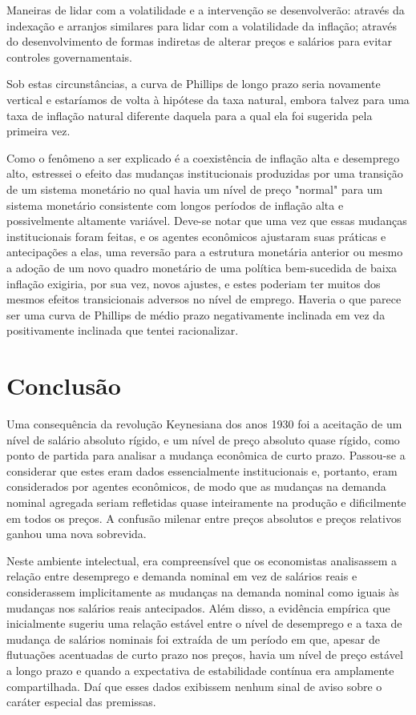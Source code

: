 \documentclass[12pt]{article}
\begin{document}
Maneiras de lidar com a volatilidade e a intervenção se desenvolverão: através da indexação e arranjos similares para lidar com a volatilidade da inflação; através do desenvolvimento de formas indiretas de alterar preços e salários para evitar controles governamentais.

Sob estas circunstâncias, a curva de Phillips de longo prazo seria novamente vertical e estaríamos de volta à hipótese da taxa natural, embora talvez para uma taxa de inflação natural diferente daquela para a qual ela foi sugerida pela primeira vez.

Como o fenômeno a ser explicado é a coexistência de inflação alta e desemprego alto, estressei o efeito das mudanças institucionais produzidas por uma transição de um sistema monetário no qual havia um nível de preço "normal" para um sistema monetário consistente com longos períodos de inflação alta e possivelmente altamente variável. Deve-se notar que uma vez que essas mudanças institucionais foram feitas, e os agentes econômicos ajustaram suas práticas e antecipações a elas, uma reversão para a estrutura monetária anterior ou mesmo a adoção de um novo quadro monetário de uma política bem-sucedida de baixa inflação exigiria, por sua vez, novos ajustes, e estes poderiam ter muitos dos mesmos efeitos transicionais adversos no nível de emprego. Haveria o que parece ser uma curva de Phillips de médio prazo negativamente inclinada em vez da positivamente inclinada que tentei racionalizar.

\section{Conclusão}

Uma consequência da revolução Keynesiana dos anos 1930 foi a aceitação de um nível de salário absoluto rígido, e um nível de preço absoluto quase rígido, como ponto de partida para analisar a mudança econômica de curto prazo. Passou-se a considerar que estes eram dados essencialmente institucionais e, portanto, eram considerados por agentes econômicos, de modo que as mudanças na demanda nominal agregada seriam refletidas quase inteiramente na produção e dificilmente em todos os preços. A confusão milenar entre preços absolutos e preços relativos ganhou uma nova sobrevida.

Neste ambiente intelectual, era compreensível que os economistas analisassem a relação entre desemprego e demanda nominal em vez de salários reais e considerassem implicitamente as mudanças na demanda nominal como iguais às mudanças nos salários reais antecipados. Além disso, a evidência empírica que inicialmente sugeriu uma relação estável entre o nível de desemprego e a taxa de mudança de salários nominais foi extraída de um período em que, apesar de flutuações acentuadas de curto prazo nos preços, havia um nível de preço estável a longo prazo e quando a expectativa de estabilidade contínua era amplamente compartilhada. Daí que esses dados exibissem nenhum sinal de aviso sobre o caráter especial das premissas.
\end{document}
